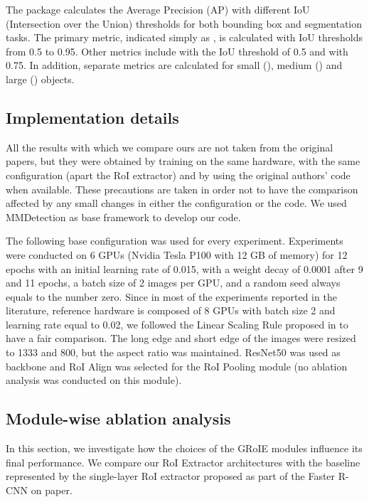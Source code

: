 \documentclass[10pt,conference,a4paper]{IEEEtran}
\begin{document}
The package calculates the Average Precision (AP) with different IoU (Intersection over the Union) thresholds for both bounding box and segmentation tasks.
The primary metric, indicated simply as , is calculated with IoU thresholds from 0.5 to 0.95.
Other metrics include  with the IoU threshold of 0.5 and  with 0.75.
In addition, separate metrics are calculated for small (), medium () and large () objects.

\subsection{Implementation details}

All the results with which we compare ours are not taken from the original papers, but they were obtained by training on the same hardware, with the same configuration (apart the RoI extractor) and by using the original authors' code when available.
These precautions are taken in order not to have the comparison affected by any small changes in either the configuration or the code.
We used MMDetection \cite{mmdetection} as base framework to develop our code.

The following base configuration was used for every experiment.
Experiments were conducted on 6 GPUs (Nvidia Tesla P100 with 12 GB of memory) for 12 epochs with an initial learning rate of 0.015, with a weight decay of 0.0001 after 9 and 11 epochs, a batch size of 2 images per GPU, and a random seed always equals to the number zero.
Since in most of the experiments reported in the literature, reference hardware is composed of 8 GPUs with batch size 2 and learning rate equal to 0.02, we followed the Linear Scaling Rule proposed in \cite{goyal2017accurate} to have a fair comparison.
The long edge and short edge of the images were resized to 1333 and 800, but the aspect ratio was maintained.
ResNet50 \cite{he2016deep} was used as backbone and RoI Align was selected for the RoI Pooling module (no ablation analysis was conducted on this module).

\subsection{Module-wise ablation analysis}
\label{Component ablation study}

In this section, we investigate how the choices of the GRoIE modules influence its final performance.
We compare our RoI Extractor architectures with the baseline represented by the single-layer RoI extractor proposed as part of the Faster R-CNN on \cite{ren2015faster} paper.
\end{document}
